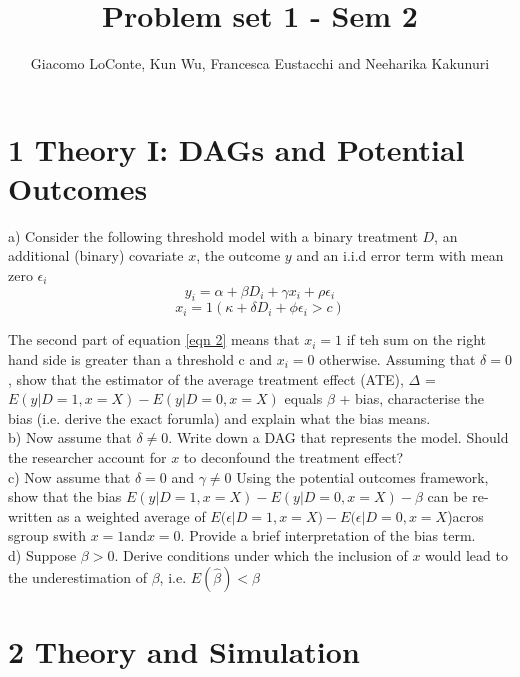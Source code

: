 \documentclass[a4paper,12pt,oneside,English]{article}
\title{Problem set 1 - Sem 2}
\author{ Giacomo LoConte, Kun Wu, Francesca Eustacchi and Neeharika Kakunuri }
\begin{document}
\maketitle
\section{ 1 Theory I: DAGs and Potential Outcomes}
a) Consider the following threshold model with a binary treatment $D$, an additional (binary) covariate $x$, the outcome $y$ and an i.i.d error term with mean zero $\epsilon_i$
\begin{equation}
    y_i = \alpha + \beta D_i + \gamma x_i + \rho \epsilon_i
\end{equation}
\begin{equation}
     x_i = 1(\kappa + \delta D_i + \phi \epsilon_i > c) 
\end{equation}\label{eqn 2}
  
The second part of equation \ref{eqn 2} means that $x_i = 1$ if teh sum on the right hand side is greater than a threshold c and $x_i = 0$ otherwise. Assuming that $\delta = 0$, show that the estimator of the average treatment effect (ATE), $\Delta$ = $E(y|D = 1 ,x = X) - E(y|D = 0 ,x = X)$ equals  $\beta$ + bias, characterise the bias (i.e. derive the exact forumla)  and explain what the bias means.\\

b) Now assume that $\delta \neq 0$. Write down a DAG that represents the model. Should the researcher account for $x$ to deconfound the treatment effect?\\

c) Now assume that $\delta = 0$ and $\gamma ≠ 0$ Using the potential outcomes framework, show that the bias $E(y|D = 1,x = X) − E(y|D = 0,x = X) − \beta$ can be re-written as a weighted average of $E(\epsilon|D=1,x=X)−E(\epsilon|D=0,x=X$)acros sgroup swith $x=1$and$x=0$. Provide a brief interpretation of the bias term.\\

d) Suppose $\beta > 0$. Derive conditions under which the inclusion of $x$ would lead to the underestimation of $\beta$, i.e. $E(\hat\beta) < \beta$

\newpage
\section{2 Theory and Simulation}
\end{document}
